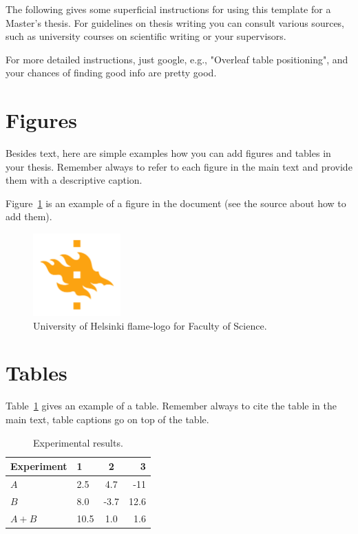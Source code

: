 The following gives some superficial instructions for using this template for a Master's thesis. For guidelines on thesis writing you can consult various sources, such as university courses on scientific writing or your supervisors.

For more detailed instructions, just google, e.g., "Overleaf table positioning", and your chances of finding good info are pretty good.  


\section{Figures}
Besides text, here are simple examples how you can add figures and tables in your thesis.
Remember always to refer to each figure in the main text and provide them with a descriptive caption.

Figure~\ref{fig:logo} is an example of a figure in the document (see the source about how to add them). 

\begin{figure}[ht] 
\begin{center}
\includegraphics[width=0.3\textwidth]{template/figures/HY-logo-ml.png}
\caption{University of Helsinki flame-logo for Faculty of Science.\label{fig:logo}}
\end{center}
\end{figure}

\section{Tables}

Table~\ref{table:results} gives an example of a table.
Remember always to cite the table in the main text, table captions go on top of the table. 

\begin{table}[h] %
\begin{center}
\caption{Experimental results.\label{table:results}} %
\begin{tabular}{l||l c r} 
Experiment & 1 & 2 & 3 \\ 
\hline \hline 
$A$ & 2.5 & 4.7 & -11 \\
$B$ & 8.0 & -3.7 & 12.6 \\
$A+B$ & 10.5 & 1.0 & 1.6 \\
\hline
%
\end{tabular}
\end{center}
\end{table}



